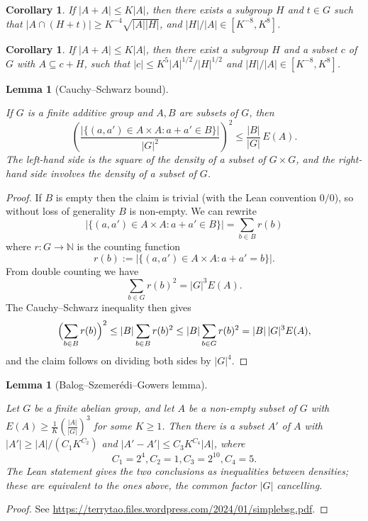 \documentclass[10pt,a4paper]{article}
\newtheorem{lemma}[theorem]{Lemma}
\newtheorem{corollary}[theorem]{Corollary}
\newcommand{\lean}[1]{}
\newcommand{\uses}[1]{}
\newcommand{\leanok}{}
\newcommand{\N}{\mathbb{N}}
\begin{document}
\begin{corollary}\label{pfr-9-aux}\lean{better_PFR_conjecture_aux0}\leanok
If $|A+A| \leq K|A|$, then there exists a subgroup $H$ and $t\in G$ such that
$|A \cap (H+t)| \geq K^{-4} \sqrt{|A||H|}$, and $|H|/|A|\in[K^{-8},K^8]$.
\end{corollary}



\begin{corollary}\label{pfr-9-aux'}\lean{better_PFR_conjecture_aux}\leanok
If $|A+A| \leq K|A|$, then there exist a subgroup $H$ and a subset $c$ of $G$
with $A \subseteq c + H$, such that $|c| \leq K^{5} |A|^{1/2}/|H|^{1/2}$ and
$|H|/|A|\in[K^{-8},K^8]$.
\end{corollary}


\begin{lemma}[Cauchy--Schwarz bound]
  \label{cs-bound}
  \uses{energy-def}
  \lean{Finset.card_sq_le_card_mul_addEnergy'}
  \leanok

  If $G$ is a finite additive group and $A,B$ are subsets of $G$, then
  $$ \left( \frac{|\{ (a,a') \in A \times A: a+a' \in B \}|}{|G|^2} \right)^2
     \leq \frac{|B|}{|G|}\, E(A). $$
  The left-hand side is the square of the density of a subset of $G \times G$, and the
  right-hand side involves the density of a subset of $G$.
\end{lemma}
\begin{proof}
  \leanok

  If $B$ is empty then the claim is trivial (with the Lean convention $0/0$),
  so without loss of generality $B$ is non-empty.  We can rewrite
  $$ |\{ (a,a') \in A \times A: a+a' \in B \}| = \sum_{b \in B} r(b)$$
  where $r: G \to \N$ is the counting function
  $$ r(b) := |\{ (a,a') \in A \times A: a+a' = b \}|.$$
  From double counting we have
  $$ \sum_{b \in G} r(b)^2 = |G|^3 E(A).$$
  The Cauchy--Schwarz inequality then gives
  $$ \Bigl( \sum_{b \in B} r(b) \Bigr)^2 \leq |B| \sum_{b \in B} r(b)^2
     \leq |B| \sum_{b \in G} r(b)^2 = |B|\, |G|^3 E(A),$$
  and the claim follows on dividing both sides by $|G|^4$.
\end{proof}

\begin{lemma}[Balog--Szemer\'edi--Gowers lemma]
  \label{bsg}
  \lean{BSG_self}
  \uses{energy-def}
  \leanok

  Let $G$ be a finite abelian group, and let $A$ be a non-empty subset of $G$
  with $E(A) \geq \frac{1}{K} \left( \frac{|A|}{|G|} \right)^3$ for some $K \geq 1$.
  Then there is a subset $A'$ of $A$ with $|A'| \geq |A| / (C_1 K^{C_2})$ and
  $|A'-A'| \leq C_3 K^{C_4} |A|$, where
  $$C_1 = 2^4, C_2 = 1, C_3 = 2^{10}, C_4 = 5.$$
  The Lean statement gives the two conclusions as inequalities between densities; these are
  equivalent to the ones above, the common factor $|G|$ cancelling.
\end{lemma}
\begin{proof}
  \leanok

  See \url{https://terrytao.files.wordpress.com/2024/01/simplebsg.pdf}.
\end{proof}
\end{document}
